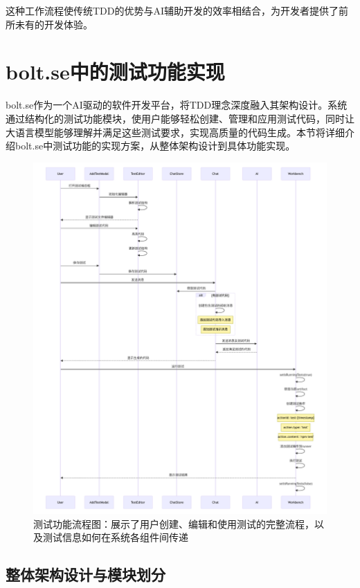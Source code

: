 这种工作流程使传统TDD的优势与AI辅助开发的效率相结合，为开发者提供了前所未有的开发体验。

\section{bolt.se中的测试功能实现}

bolt.se作为一个AI驱动的软件开发平台，将TDD理念深度融入其架构设计。系统通过结构化的测试功能模块，使用户能够轻松创建、管理和应用测试代码，同时让大语言模型能够理解并满足这些测试要求，实现高质量的代码生成。本节将详细介绍bolt.se中测试功能的实现方案，从整体架构设计到具体功能实现。

\begin{figure}[htbp]
  \centering
  \includegraphics[width=\textwidth]{figures/bolt_test_sequence.pdf}
  \caption{测试功能流程图：展示了用户创建、编辑和使用测试的完整流程，以及测试信息如何在系统各组件间传递}
  \label{fig:test_sequence}
\end{figure}

\subsection{整体架构设计与模块划分}

